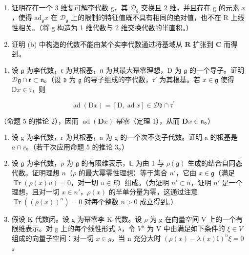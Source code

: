 \begin{enumerate}
\def\labelenumi{(\alph{enumi})}
\setcounter{enumi}{1}
\item
  证明存在一个 3 维复可解李代数 g，其 \(\mathcal{D}_{\mathfrak{g}}\) 交换且 2 维，并且存在 g 的元素 \(x\)，使得 \(\mathrm{ad}_{\mathfrak{g}}x\) 在 \(\mathcal{D}_{\mathfrak{g}}\) 上的限制的特征值既不具有相同的绝对值，也不在 R 上线性相关。（将 g 构造为 1 维代数与 2 维交换代数的半直积。）
\item
  证明 (b) 中构造的代数不能由某个实李代数通过将基域从 \(\mathbf{R}\) 扩张到 \(\mathbf{C}\) 而得到。
\end{enumerate}

\begin{enumerate}
\def\labelenumi{\arabic{enumi}.}
\setcounter{enumi}{8}
\tightlist
\item
  设 \(\mathfrak{g}\) 为李代数，\(\mathfrak{r}\) 为其根基，\(\mathfrak{n}\) 为其最大幂零理想，D 为 \(\mathfrak{g}\) 的一个导子。证明 \(\mathcal{D}\mathfrak{g} \cap \mathfrak{r} \subset \mathfrak{n}\)。（设 \(\mathfrak{d}\) 为 \(\mathfrak{g}\) 的导子组成的李代数，\(\mathfrak{r}'\) 为其根基。若 \(x \in \mathfrak{g}\) 使得 \(\mathrm{D}x \in \mathfrak{r}\)，则
\end{enumerate}

\[
\operatorname{ad} (\mathrm{D} x) = [ \mathrm{D}, \operatorname{ad} x ] \in \mathscr {D} \mathfrak {d} \cap \mathfrak {r} ^ {\prime}
\]

（命题 5 的推论 2），因而 \(\operatorname{ad}(\mathbf{D}x)\) 幂零（定理 1），从而 \(\mathbf{D}x \in \mathfrak{n}\)。）

\begin{enumerate}
\def\labelenumi{\arabic{enumi}.}
\setcounter{enumi}{9}
\item
  设 g 为李代数，r 为其根基，a 为 g 的一个次不变子代数。证明 a 的根基是 \(a \cap r\)。（若干次应用命题 5 的推论 3。）
\item
  设 \(\mathfrak{g}\) 为李代数，\(\rho\) 为 \(\mathfrak{g}\) 的有限维表示，\(\mathbb{E}\) 为由 1 与 \(\rho(\mathfrak{g})\) 生成的结合自同态代数。证明理想 \(n\)（\(\rho\) 的最大幂零性理想）等于集合 \(n'\)，它由 \(x \in \mathfrak{g}\)（满足 \(\operatorname{Tr}(\rho(x)u) = 0\)，对一切 \(u \in E\)）组成。（为证明 \(n' \subset n\)，证明 \(n'\) 是一个理想，且对一切 \(x \in n'\)，\(\rho(x)\) 的半单分量为零，这通过注意 \(\operatorname{Tr}((\rho(x))^n) = 0\) 对每个整数 \(n > 0\) 成立得到。）
\item
  假设 K 代数闭。设 g 为幂零李 K-代数。设 \(\rho\) 为 g 在向量空间 V 上的一个有限维表示。对 g 上的每个线性形式 \(\lambda\)，令 \(V^{\lambda}\) 为 V 中由满足如下条件的 \(\xi \in V\) 组成的向量子空间：对一切 \(x \in g\)，当 n 充分大时 \((\rho(x) - \lambda(x)\mathrm{I})^{n}\xi = 0\)。
\end{enumerate}


